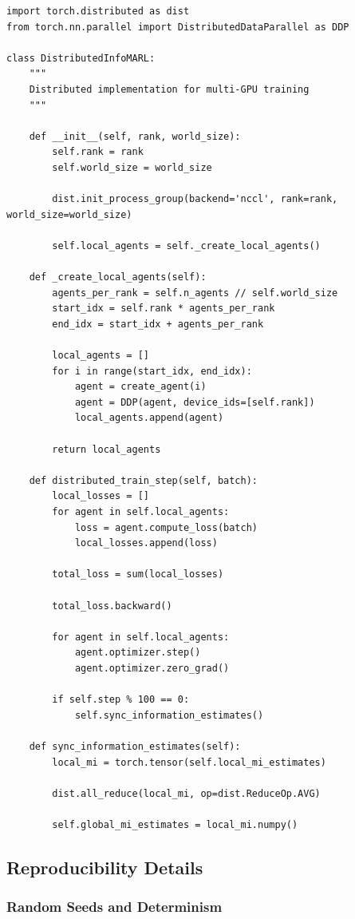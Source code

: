 \documentclass[10pt, letterpaper]{article}
\begin{document}
\begin{lstlisting}
import torch.distributed as dist
from torch.nn.parallel import DistributedDataParallel as DDP

class DistributedInfoMARL:
    """
    Distributed implementation for multi-GPU training
    """

    def __init__(self, rank, world_size):
        self.rank = rank
        self.world_size = world_size

        dist.init_process_group(backend='nccl', rank=rank, world_size=world_size)

        self.local_agents = self._create_local_agents()

    def _create_local_agents(self):
        agents_per_rank = self.n_agents // self.world_size
        start_idx = self.rank * agents_per_rank
        end_idx = start_idx + agents_per_rank

        local_agents = []
        for i in range(start_idx, end_idx):
            agent = create_agent(i)
            agent = DDP(agent, device_ids=[self.rank])
            local_agents.append(agent)

        return local_agents

    def distributed_train_step(self, batch):
        local_losses = []
        for agent in self.local_agents:
            loss = agent.compute_loss(batch)
            local_losses.append(loss)

        total_loss = sum(local_losses)

        total_loss.backward()

        for agent in self.local_agents:
            agent.optimizer.step()
            agent.optimizer.zero_grad()

        if self.step % 100 == 0:
            self.sync_information_estimates()

    def sync_information_estimates(self):
        local_mi = torch.tensor(self.local_mi_estimates)

        dist.all_reduce(local_mi, op=dist.ReduceOp.AVG)

        self.global_mi_estimates = local_mi.numpy()
\end{lstlisting}

\subsection{Reproducibility Details}

\subsubsection{Random Seeds and Determinism}
\end{document}
